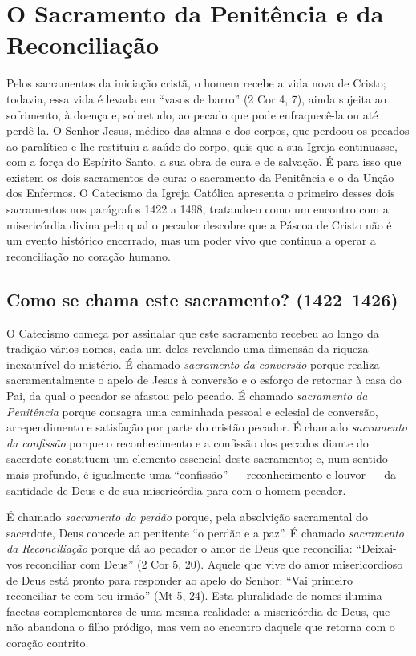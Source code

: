 \chapter{O Sacramento da Penitência e da Reconciliação}

Pelos sacramentos da iniciação cristã, o homem recebe a vida nova de Cristo; todavia, essa vida é levada em ``vasos de barro'' (2 Cor 4, 7), ainda sujeita ao sofrimento, à doença e, sobretudo, ao pecado que pode enfraquecê-la ou até perdê-la. O Senhor Jesus, médico das almas e dos corpos, que perdoou os pecados ao paralítico e lhe restituiu a saúde do corpo, quis que a sua Igreja continuasse, com a força do Espírito Santo, a sua obra de cura e de salvação. É para isso que existem os dois sacramentos de cura: o sacramento da Penitência e o da Unção dos Enfermos. O Catecismo da Igreja Católica apresenta o primeiro desses dois sacramentos nos parágrafos 1422 a 1498, tratando-o como um encontro com a misericórdia divina pelo qual o pecador descobre que a Páscoa de Cristo não é um evento histórico encerrado, mas um poder vivo que continua a operar a reconciliação no coração humano.

\section{Como se chama este sacramento? (1422--1426)}

O Catecismo começa por assinalar que este sacramento recebeu ao longo da tradição vários nomes, cada um deles revelando uma dimensão da riqueza inexaurível do mistério. É chamado \emph{sacramento da conversão} porque realiza sacramentalmente o apelo de Jesus à conversão e o esforço de retornar à casa do Pai, da qual o pecador se afastou pelo pecado. É chamado \emph{sacramento da Penitência} porque consagra uma caminhada pessoal e eclesial de conversão, arrependimento e satisfação por parte do cristão pecador. É chamado \emph{sacramento da confissão} porque o reconhecimento e a confissão dos pecados diante do sacerdote constituem um elemento essencial deste sacramento; e, num sentido mais profundo, é igualmente uma ``confissão'' --- reconhecimento e louvor --- da santidade de Deus e de sua misericórdia para com o homem pecador.

É chamado \emph{sacramento do perdão} porque, pela absolvição sacramental do sacerdote, Deus concede ao penitente ``o perdão e a paz''. É chamado \emph{sacramento da Reconciliação} porque dá ao pecador o amor de Deus que reconcilia: ``Deixai-vos reconciliar com Deus'' (2 Cor 5, 20). Aquele que vive do amor misericordioso de Deus está pronto para responder ao apelo do Senhor: ``Vai primeiro reconciliar-te com teu irmão'' (Mt 5, 24). Esta pluralidade de nomes ilumina facetas complementares de uma mesma realidade: a misericórdia de Deus, que não abandona o filho pródigo, mas vem ao encontro daquele que retorna com o coração contrito.

